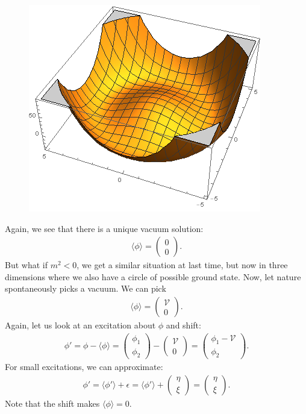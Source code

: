 \documentclass{book}
\numberwithin{equation}{section}
\theoremstyle{definition}
\begin{document}
\begin{figure}[h!]
	\centering
	\includegraphics[scale=1]{hat.png}
\end{figure}
Again, we see that there is a unique vacuum solution:
\begin{align}
\langle \phi \rangle = \begin{pmatrix}
0\\0
\end{pmatrix}.
\end{align}
But what if $m^2 < 0$, we get a similar situation at last time, but now in three dimensions where we also have a circle of possible ground state. Now, let nature spontaneously picks a vacuum. We can pick
\begin{align}
\langle \phi \rangle = \begin{pmatrix}
\mathcal{V}\\0
\end{pmatrix}.
\end{align}
Again, let us look at an excitation about $\phi$ and shift:
\begin{align}
\phi' = \phi - \langle \phi \rangle = \begin{pmatrix}
\phi_1\\\phi_2
\end{pmatrix} - \begin{pmatrix}
\mathcal{V}\\0
\end{pmatrix} = 
\begin{pmatrix}
\phi_1 - \mathcal{V}\\\phi_2
\end{pmatrix}.
\end{align}
For small excitations, we can approximate:
\begin{align}
\phi' = \langle \phi'\rangle + \epsilon = \langle \phi' \rangle + \begin{pmatrix}
\eta \\ \xi
\end{pmatrix}=
\begin{pmatrix}
\eta \\ \xi
\end{pmatrix}.
\end{align}
Note that the shift makes $\langle \phi \rangle = 0$.\\
\end{document}
